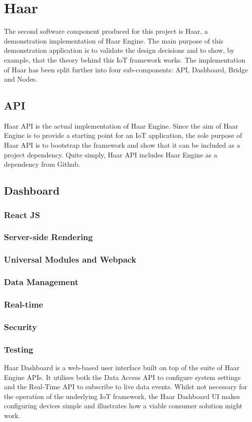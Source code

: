   \section{Haar}
    The second software component produced for this project is Haar, a demonstration implementation of Haar Engine. The main purpose of this demonstration application is to validate the design decisions and to show, by example, that the theory behind this IoT framework works. The implementation of Haar has been split further into four sub-components: API, Dashboard, Bridge and Nodes.

    \subsection{API}
      Haar API is the actual implementation of Haar Engine. Since the aim of Haar Engine is to provide a starting point for an IoT application, the sole purpose of Haar API is to bootstrap the framework and show that it can be included as a project dependency. Quite simply, Haar API includes Haar Engine as a dependency from Github.

    \subsection{Dashboard}
      \subsubsection{React JS}
      \subsubsection{Server-side Rendering}
      \subsubsection{Universal Modules and Webpack}
      \subsubsection{Data Management}
      \subsubsection{Real-time}
      \subsubsection{Security}
      \subsubsection{Testing}
      Haar Dashboard is a web-based user interface built on top of the suite of Haar Engine APIs. It utilises both the Data Access API to configure system settings and the Real-Time API to subscribe to live data events. Whilst not necessary for the operation of the underlying IoT framework, the Haar Dashboard UI makes configuring devices simple and illustrates how a viable consumer solution might work.

